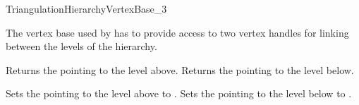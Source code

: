 
\begin{ccRefConcept}{TriangulationHierarchyVertexBase_3}

\ccDefinition

The vertex base used by  has to provide
access to two vertex handles for linking between the levels of the hierarchy.



\ccAccessFunctions
{}
\ccTagFullDeclarations

{Returns the  pointing to the level above.}
\ccGlue
{}
{Returns the  pointing to the level below.}


{Sets the  pointing to the level above to .}
\ccGlue
{}
{Sets the  pointing to the level below to .}

\ccHasModels



\end{ccRefConcept}
